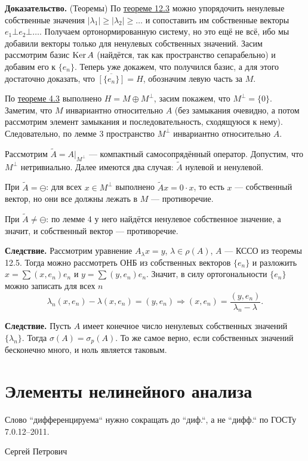 \textbf{Доказательство.} (Теоремы) По \hyperref[th:12-3]{теореме 12.3} можно упорядочить ненулевые собственные значения $|\lambda_1| \ge |\lambda_2| \ge \dots$ и сопоставить им собственные векторы $e_1 \bot e_2 \bot \dots$.
Получаем ортонормированную систему, но это ещё не всё, ибо мы добавили векторы только для ненулевых собственных значений.
Засим рассмотрим базис $\operatorname{Ker} A$ (найдётся, так как пространство сепарабельно) и добавим его к $\{e_n\}$.
Теперь уже докажем, что получился базис, а для этого достаточно доказать, что $\overline {[\{e_n\}]} = H$, обозначим левую часть за $M$.

По \hyperref[th:4-3]{теореме 4.3} выполнено $H = M \oplus M^\bot$, засим покажем, что $M^\bot = \{0\}$.
Заметим, что $M$ инвариантно относительно $A$ (без замыкания очевидно, а потом рассмотрим элемент замыкания и последовательность, сходящуюся к нему).
Следовательно, по лемме 3 пространство $M^\bot$ инвариантно относительно $A$.

Рассмотрим $\tilde A = A|_{M^\bot}$ --- компактный самосопрядённый оператор.
Допустим, что $M^\bot$ нетривиально.
Далее имеются два случая: $\tilde A$ нулевой и ненулевой.

При $\tilde A = \ominus$: для всех $x \in M^\bot$ выполнено $\tilde Ax = 0 \cdot x$, то есть $x$ --- собственный вектор, но они все должны лежать в $M$ --- противоречие.

При $\tilde A \ne \ominus$: по лемме 4 у него найдётся ненулевое собственное значение, а значит, и собственный вектор --- противоречие.

\QED

\textbf{Следствие.}
Рассмотрим уравнение $A_\lambda x = y$, $\lambda \in \rho(A)$, $A$ --- КССО из теоремы 12.5.
Тогда можно рассмотреть ОНБ из собственных векторов $\{e_n\}$ и разложить $x = \sum (x, e_n) e_n$ и $y = \sum (y, e_n) e_n$.
Значит, в силу ортогональности $\{e_n\}$ можно записать для всех $n$
\[
    \lambda_n (x, e_n) - \lambda (x, e_n) = (y, e_n) \Rightarrow (x, e_n) = \frac{(y, e_n)}{\lambda_n - \lambda}.
\]

\textbf{Следствие.} Пусть $A$ имеет конечное число ненулевых собственных значений $\{\lambda_n\}$.
Тогда $\sigma(A) = \sigma_p(A)$.
То же самое верно, если собственных значений бесконечно много, и ноль является таковым.

\section{Элементы нелинейного анализа}
\epigraph{Слово ``дифференцируема`` нужно сокращать до ``диф.``, а не ``дифф.`` по ГОСТу 7.0.12--2011.}{Сергей Петрович}
